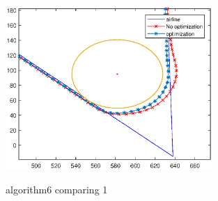 \begin{figure}[htbp]
{\begin{minipage}[t]{0.48\linewidth}
                \centering
                    \includegraphics[width=0.7\textwidth]{pictures/eps/algorithm7_2.eps}
                \label{fig:algo7_2}
            \end{minipage}
        }
        \caption{algorithm6 comparing 1}
    \end{figure}
    
